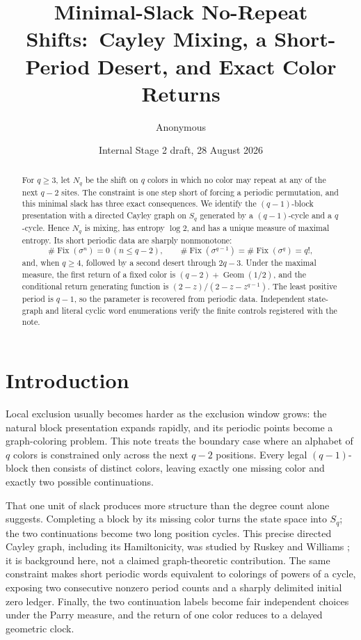 \documentclass[11pt,a4paper]{amsart}
\title[Minimal-slack no-repeat shifts]{Minimal-Slack No-Repeat Shifts:\ Cayley Mixing, a Short-Period Desert, and Exact Color Returns}
\author{Anonymous}
\date{Internal Stage 2 draft, 28 August 2026}
\theoremstyle{definition}
\theoremstyle{remark}
\newcommand{\Fix}{\operatorname{Fix}}
\begin{document}
\begin{abstract}
For $q\geq3$, let $N_q$ be the shift on $q$ colors in which no color may
repeat at any of the next $q-2$ sites.  The constraint is one step short of
forcing a periodic permutation, and this minimal slack has three exact
consequences.  We identify the $(q-1)$-block presentation with a directed
Cayley graph on $S_q$ generated by a $(q-1)$-cycle and a $q$-cycle.  Hence
$N_q$ is mixing, has entropy $\log2$, and has a unique measure of maximal
entropy.  Its short periodic data are sharply nonmonotone:
\[
 \#\Fix(\sigma^n)=0\ (n\leq q-2),\qquad
 \#\Fix(\sigma^{q-1})=\#\Fix(\sigma^q)=q!,
\]
and, when $q\geq4$, followed by a second desert through $2q-3$.  Under the maximal measure, the
first return of a fixed color is $(q-2)+\operatorname{Geom}(1/2)$, and the
conditional return generating function is
$(2-z)/(2-z-z^{q-1})$.  The least positive period is $q-1$, so the parameter
is recovered from periodic data.  Independent state-graph and literal cyclic
word enumerations verify the finite controls registered with the note.
\end{abstract}

\maketitle

\section{Introduction}

Local exclusion usually becomes harder as the exclusion window grows: the
natural block presentation expands rapidly, and its periodic points become a
graph-coloring problem.  This note treats the boundary case where an alphabet
of $q$ colors is constrained only across the next $q-2$ positions.  Every
legal $(q-1)$-block then consists of distinct colors, leaving exactly one
missing color and exactly two possible continuations.

That one unit of slack produces more structure than the degree count alone
suggests.  Completing a block by its missing color turns the state space into
$S_q$; the two continuations become two long position cycles.  This precise
directed Cayley graph, including its Hamiltonicity, was studied by
Ruskey and Williams \cite{RuskeyWilliams2010}; it is background here, not a
claimed graph-theoretic contribution.  The same constraint makes short
periodic words equivalent to colorings of powers of a cycle, exposing two
consecutive nonzero period counts and a sharply delimited initial zero
ledger.  Finally, the two continuation labels become fair independent choices
under the Parry measure, and the return of one color reduces to a delayed
geometric clock.
\end{document}
